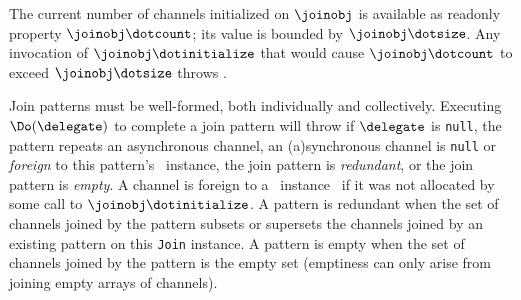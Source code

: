 The current number of channels initialized on $\joinobj$ is available as readonly property $\joinobj\dotcount$; 
its value is bounded by $\joinobj\dotsize$.
Any invocation of $\joinobj\dotinitialize$ that would cause $\joinobj\dotcount$ to exceed $\joinobj\dotsize$ throws .


Join patterns must be well-formed, both individually and collectively. Executing $\Do(\delegate)$ to
complete a join pattern will throw  if $\delegate$ is
\texttt{null}, the pattern repeats an asynchronous channel, an (a)synchronous
channel is \texttt{null} or \emph{foreign} to this pattern's \cjoin\ instance, the
join pattern is \emph{redundant}, or the join pattern is \emph{empty}.
A channel is foreign to a \cjoin\ instance \joinobj\ if it was not allocated by some call to
$\joinobj\dotinitialize$.
A pattern is redundant when the set
of channels joined by the pattern subsets or supersets the channels
joined by an existing pattern on this \texttt{Join} instance.
A pattern is empty when the set of channels joined by the pattern is the empty set 
(emptiness can only arise from joining empty arrays of channels).






